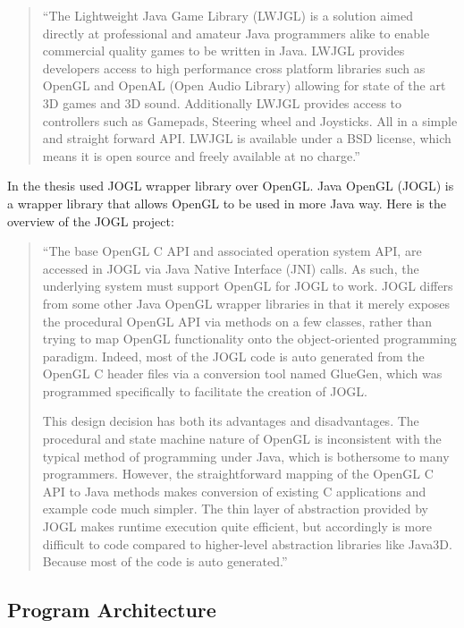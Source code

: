 \begin{quotation}
``The Lightweight Java Game Library (LWJGL) is a solution aimed directly at professional and amateur Java programmers
alike to enable commercial quality games to be written in Java. LWJGL provides developers access to
high performance cross platform libraries such as OpenGL and OpenAL (Open Audio Library) allowing for state of the art
3D games and 3D sound. Additionally LWJGL provides access to controllers such as Gamepads, Steering wheel and Joysticks.
All in a simple and straight forward API.
LWJGL is available under a BSD license, which means it is open source and freely available at no charge.''~\cite{LWJGL}
\end{quotation}


In the thesis used JOGL wrapper library over OpenGL. Java OpenGL (JOGL) is a wrapper library that allows OpenGL to be used in more Java way. Here is the overview of the JOGL project:

\begin{quotation}
``The base OpenGL C API and associated operation system API, are accessed in JOGL via Java Native Interface (JNI) calls.
As such, the underlying system must support OpenGL for JOGL to work.
JOGL differs from some other Java OpenGL wrapper libraries in that it merely exposes the procedural OpenGL API
via methods on a few classes, rather than trying to map OpenGL functionality onto the object-oriented programming paradigm.
Indeed, most of the JOGL code is auto generated from the OpenGL C header files via a conversion tool named GlueGen,
which was programmed specifically to facilitate the creation of JOGL.

This design decision has both its advantages and disadvantages.
The procedural and state machine nature of OpenGL is inconsistent with the typical method of programming under Java,
which is bothersome to many programmers. However, the straightforward mapping of the OpenGL C API to Java methods
makes conversion of existing C applications and example code much simpler.
The thin layer of abstraction provided by JOGL makes runtime execution quite efficient,
but accordingly is more difficult to code compared to higher-level abstraction libraries like Java3D.
Because most of the code is auto generated.''~\cite{JOGL}
\end{quotation}


\subsection{Program Architecture}

